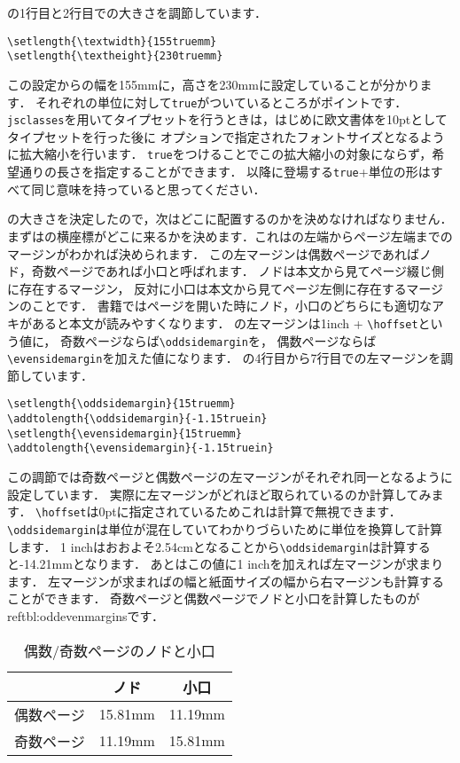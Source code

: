 の1行目と2行目での大きさを調節しています．
\begin{verbatim}
\setlength{\textwidth}{155truemm}
\setlength{\textheight}{230truemm}
\end{verbatim}

この設定からの幅を155mmに，高さを230mmに設定していることが分かります．
それぞれの単位に対して\texttt{true}がついているところがポイントです．
\texttt{jsclasses}を用いてタイプセットを行うときは，はじめに欧文書体を10ptとしてタイプセットを行った後に
オプションで指定されたフォントサイズとなるように拡大縮小を行います．
\texttt{true}をつけることでこの拡大縮小の対象にならず，希望通りの長さを指定することができます．
以降に登場する\texttt{true}+単位の形はすべて同じ意味を持っていると思ってください．

の大きさを決定したので，次はどこに配置するのかを決めなければなりません．
まずはの横座標がどこに来るかを決めます．これはの左端からページ左端までのマージンがわかれば決められます．
この左マージンは偶数ページであればノド，奇数ページであれば小口と呼ばれます．
ノドは本文から見てページ綴じ側に存在するマージン，
反対に小口は本文から見てページ左側に存在するマージンのことです．
書籍ではページを開いた時にノド，小口のどちらにも適切なアキがあると本文が読みやすくなります．
の左マージンは1inch + \verb|\hoffset|という値に，
奇数ページならば\verb|\oddsidemargin|を，
偶数ページならば\verb|\evensidemargin|を加えた値になります．
の4行目から7行目での左マージンを調節しています．

\begin{verbatim}
\setlength{\oddsidemargin}{15truemm}
\addtolength{\oddsidemargin}{-1.15truein}
\setlength{\evensidemargin}{15truemm}
\addtolength{\evensidemargin}{-1.15truein}
\end{verbatim}

この調節では奇数ページと偶数ページの左マージンがそれぞれ同一となるように設定しています．
実際に左マージンがどれほど取られているのか計算してみます．
\verb|\hoffset|は0ptに指定されているためこれは計算で無視できます．
\verb|\oddsidemargin|は単位が混在していてわかりづらいために単位を換算して計算します．
1 inchはおおよそ2.54cmとなることから\verb|\oddsidemargin|は計算すると-14.21mmとなります．
あとはこの値に1 inchを加えれば左マージンが求まります．
左マージンが求まればの幅と紙面サイズの幅から右マージンも計算することができます．
奇数ページと偶数ページでノドと小口を計算したものが\tablename\,ref{tbl:oddevenmargins}です．
\begin{table}[!ht]
	\centering
	\caption{偶数/奇数ページのノドと小口}
	\label{tbl:oddevenmargins}
	\begin{tabular}{c|cc} \hline \hline
		& ノド & 小口 \\ \hline
		偶数ページ & 15.81mm & 11.19mm \\
		奇数ページ & 11.19mm & 15.81mm \\ \hline
	\end{tabular}
\end{table} 


